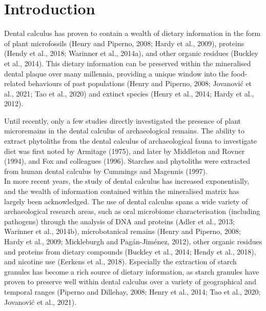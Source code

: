 \documentclass[utf8]{../templates/frontiersSCNS}
\begin{document}
\hypertarget{introduction}{%
\section{Introduction}\label{introduction}}

Dental calculus has proven to contain a wealth of
dietary information in the form of plant microfossils
(Henry and Piperno, 2008; Hardy et al., 2009),
proteins (Hendy et al., 2018; Warinner et al., 2014a),
and other organic residues (Buckley et al., 2014).
This dietary information can be preserved within the mineralised dental plaque
over many millennia, providing a unique window into the food-related behaviours of
past populations
(Henry and Piperno, 2008; Jovanović et al., 2021; Tao et al., 2020)
and extinct species (Henry et al., 2014; Hardy et al., 2012).

Until recently, only a few studies directly investigated the presence of plant
microremains
in the dental calculus of archaeological remains. The ability to extract phytoliths
from the dental calculus of archaeological fauna to investigate diet was first
noted by Armitage (1975),
and later by Middleton and Rovner (1994),
and Fox and colleagues (1996). Starches and phytoliths were
extracted from human dental calculus by Cummings and Magennis (1997).\\
In more recent years, the study of dental calculus has increased exponentially,
and the wealth of information contained within the mineralised matrix has largely
been acknowledged. The use of dental calculus spans a wide
variety of archaeological research areas, such as oral microbiome
characterisation (including pathogens) through the analysis of DNA and proteins
(Adler et al., 2013; Warinner et al., 2014b),
microbotanical remains (Henry and Piperno, 2008; Hardy et al., 2009; Mickleburgh and Pagán-Jiménez, 2012),
other organic residues and proteins from dietary compounds
(Buckley et al., 2014; Hendy et al., 2018),
and nicotine use (Eerkens et al., 2018). Especially the extraction
of starch granules has become a rich source of dietary
information, as starch granules have proven to preserve well within dental calculus
over a variety of geographical and temporal ranges
(Piperno and Dillehay, 2008; Henry et al., 2014; Tao et al., 2020; Jovanović et al., 2021).
\end{document}
